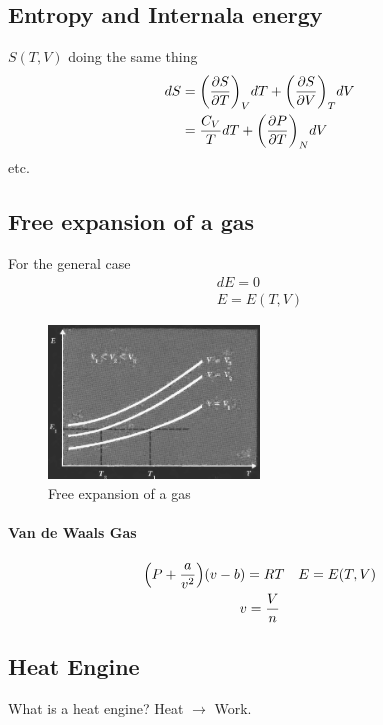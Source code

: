 \documentclass[../main.tex]{subfiles}
\begin{document}
\subsection{Entropy and Internala energy}

$S(T,V)$ doing the same thing
\begin{align*}
    dS &= \qt(\pdv{S}{T})_V dT + \qt(\pdv{S}{V})_T dV \\
    &= \frac{C_V}{T} dT + \qt(\pdv{P}{T})_N dV
\end{align*}
etc.

\subsection{Free expansion of a gas} 

For the general case
\begin{gather*}
    dE = 0 \\
    E = E(T,V)
\end{gather*}

\begin{figure}[ht]
    \centering
    \includegraphics[width=0.5\textwidth]{fig5_1.png}
    \caption{Free expansion of a gas}
    \label{fig:5_1}
\end{figure}

\paragraph{Van de Waals Gas}
\begin{gather*}
    \qt(P + \frac{a}{v^2}) (v - b) = RT \quad E = E(T,V) \\
    v = \frac{V}{n}
\end{gather*}

\newpage
{}
\subsection{Heat Engine}
What is a heat engine? Heat $\to$ Work.
\end{document}
